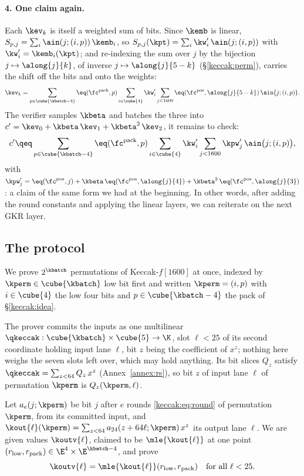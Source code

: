 \paragraph{4. One claim again.} Each $\kev_k$ is itself a weighted sum of bits. Since $\kemb$ is linear, $S_{p,j}=\sum_i\ain(j;(i,p))\,\kemb_i$, so $S_{p,j}(\kpt)=\sum_i\kw'_i\,\ain(j;(i,p))$ with $\kw'_i=\kemb_i(\kpt)$; and re-indexing the sum over $j$ by the bijection $j\mapsto\along{j}{k}$, of inverse $j\mapsto\along{j}{5-k}$ (\S\ref{keccak:perm}), carries the shift off the bits and onto the weights:
\[
\kev_k=\sum_{p\in\cube{\kbatch-4}}\eq(\fc^{\mathrm{pack}},p)\sum_{i\in\cube{4}}\kw'_i\sum_{j<1600}\eq(\fc^{\mathrm{pos}},\along{j}{5-k})\,\ain\bigl(j;(i,p)\bigr).
\]
The verifier samples $\kbeta$ and batches the three into $c'=\kev_0+\kbeta\,\kev_1+\kbeta^{2}\,\kev_2$, it remains to check:
\[
c'\qeq\sum_{p\in\cube{\kbatch-4}}\eq(\fc^{\mathrm{pack}},p)\sum_{i\in\cube{4}}\kw'_i\sum_{j<1600}\kpw'_j\,\ain\bigl(j;(i,p)\bigr),
\]
with $\kpw'_j=\eq(\fc^{\mathrm{pos}},j)+\kbeta\,\eq(\fc^{\mathrm{pos}},\along{j}{4})+\kbeta^{2}\,\eq(\fc^{\mathrm{pos}},\along{j}{3})$: a claim of the same form we had at the beginning. In other words, after adding the round constants and applying the linear layers, we can reiterate on the next GKR layer.

\subsection{The protocol}\label{keccak:statement}

We prove $2^{\kbatch}$ permutations of Keccak-$f[1600]$ at once, indexed by $\kperm\in\cube{\kbatch}$ low bit first and written $\kperm=(i,p)$ with $i\in\cube{4}$ the low four bits and $p\in\cube{\kbatch-4}$ the pack of \S\ref{keccak:idea}.

The prover commits the inputs as one multilinear $\qkeccak:\cube{\kbatch}\times\cube{5}\to\K$, slot $\ell<25$ of its second coordinate holding input lane $\ell$, bit $z$ being the coefficient of $x^z$; nothing here weighs the seven slots left over, which may hold anything. Its bit slices $Q_z$ satisfy $\qkeccak=\sum_{z<64}Q_z\,x^z$ (Annex~\ref{annex:rs}), so bit $z$ of input lane $\ell$ of permutation $\kperm$ is $Q_z(\kperm,\ell)$.

Let $a_e(j;\kperm)$ be bit $j$ after $e$ rounds \eqref{keccak:eq:round} of permutation $\kperm$, from its committed input, and $\kout{\ell}(\kperm)=\sum_{z<64}a_{24}(z+64\ell;\kperm)\,x^z$ its output lane $\ell$. We are given values $\koutv{\ell}$, claimed to be $\mle{\kout{\ell}}$ at one point $(r_{\mathrm{low}},r_{\mathrm{pack}})\in\E^{4}\times\E^{\kbatch-4}$, and prove
\begin{equation}\label{keccak:eq:statement}
\koutv{\ell}=\mle{\kout{\ell}}(r_{\mathrm{low}},r_{\mathrm{pack}})\quad\text{for all }\ell<25.
\end{equation}

